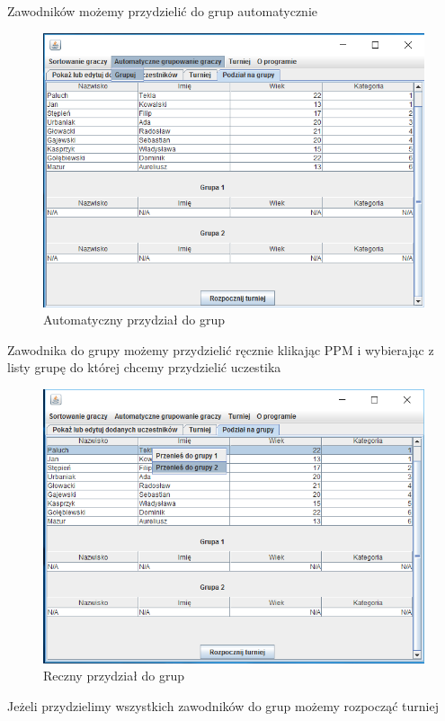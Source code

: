 Zawodników możemy przydzielić do grup automatycznie
\begin{figure}[H]
	\centering
	\includegraphics[width=15cm]{fig/9}
	\caption{Automatyczny przydział do grup}
	\label {fig:Automatyczny_przydzial_do_grup} 
\end{figure}
Zawodnika do grupy możemy przydzielić ręcznie klikając PPM i wybierając z listy grupę do której chcemy przydzielić uczestika
\begin{figure}[H]
	\centering
	\includegraphics[width=15cm]{fig/10}
	\caption{Reczny przydział do grup}
	\label {fig:Reczny_przydzial_do_grup} 
\end{figure}
Jeżeli przydzielimy wszystkich zawodników do grup możemy rozpocząć turniej
